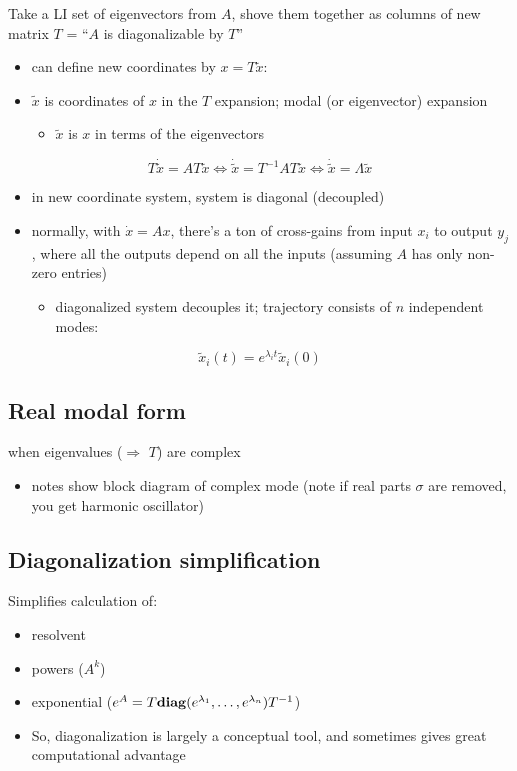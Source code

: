 \documentclass[10pt,letterpaper]{article}
\begin{document}
Take a LI set of eigenvectors from $A$, shove them together as columns of new matrix $T$ = ``$A$ is diagonalizable by $T$''
\begin{itemize}
\item can define new coordinates by $x=T \tilde x$:
\item $\tilde x$ is coordinates of $x$ in the $T$ expansion; modal (or eigenvector) expansion

\begin{itemize}
\item $\tilde x$ is $x$ in terms of the eigenvectors
\end{itemize}

\end{itemize}
$$
T \dot{\tilde x}=AT \tilde x \Leftrightarrow \dot{ \tilde x}= T ^{-1} AT \tilde x \Leftrightarrow \dot{ \tilde x} = \Lambda \tilde x
$$
\begin{itemize}
\item in new coordinate system, system is diagonal (decoupled)
\item normally, with $\dot x=Ax$, there's a ton of cross-gains from input $x_i$ to output $y_j$, where all the outputs depend on all the inputs (assuming $A$ has only non-zero entries)

\begin{itemize}
\item diagonalized system decouples it; trajectory consists of $n$ independent modes:
\end{itemize}

\end{itemize}
$$
\tilde x_i (t) = e ^{\lambda_i t} \tilde x _{i} (0)
$$
\subsection{Real modal form}
\label{sec-11_7}

when eigenvalues ($\Rightarrow$ $T$) are complex
\begin{itemize}
\item notes show block diagram of complex mode (note if real parts $\sigma$ are removed, you get harmonic oscillator)
\end{itemize}
\subsection{Diagonalization simplification}
\label{sec-11_8}

Simplifies calculation of:
\begin{itemize}
\item resolvent
\item powers ($A^k$)
\item exponential ($e ^{A}=T {\bf diag} (e ^{\lambda_1},\dots, e ^{\lambda_n}) T ^{-1}$)
\item So, diagonalization is largely a conceptual tool, and sometimes gives great computational advantage
\end{itemize}
\end{document}
